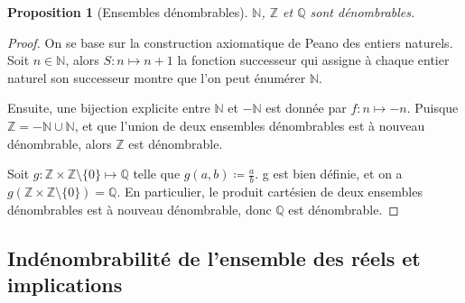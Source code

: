 \documentclass{article}
\theoremstyle{definition}
\theoremstyle{plain}
\newtheorem{proposition}[subsubsection]{Proposition}
\theoremstyle{plain}
\theoremstyle{plain}
\theoremstyle{plain}
\theoremstyle{plain}
\begin{document}
\begin{proposition}[Ensembles dénombrables]
	\( \mathbb{N} \), \( \mathbb{Z} \) et \( \mathbb{Q} \) sont dénombrables. \cite{tao2014analysis}
\end{proposition}
\begin{proof}
	On se base sur la construction axiomatique de Peano des entiers naturels. 
	Soit \( n \in \mathbb{N} \), alors \( S : n \mapsto n+1 \) la fonction successeur qui assigne à chaque entier naturel son successeur montre que l'on peut énumérer \( \mathbb{N} \).
	
	\par Ensuite, une bijection explicite entre \( \mathbb{N} \) et \( \mathbb{-N} \) est donnée par \( f : n \mapsto -n \). Puisque \( \mathbb{Z} = \mathbb{-N} \cup \mathbb{N} \), et que l'union de deux ensembles dénombrables est à nouveau dénombrable, alors \( \mathbb{Z} \) est dénombrable.
	
	\par Soit \( g : \mathbb{Z} \times \mathbb{Z} \setminus \{0\} \mapsto \mathbb{Q} \) telle que \( g(a,b) \coloneqq \frac{a}{b} \). g est bien définie, et on a \( g(\mathbb{Z} \times \mathbb{Z} \setminus \{0\} ) = \mathbb{Q} \). En particulier, le produit cartésien de deux ensembles dénombrables est à nouveau dénombrable, donc \( \mathbb{Q} \) est dénombrable.

\end{proof}

\subsection{Indénombrabilité de l'ensemble des réels et implications}
\end{document}
